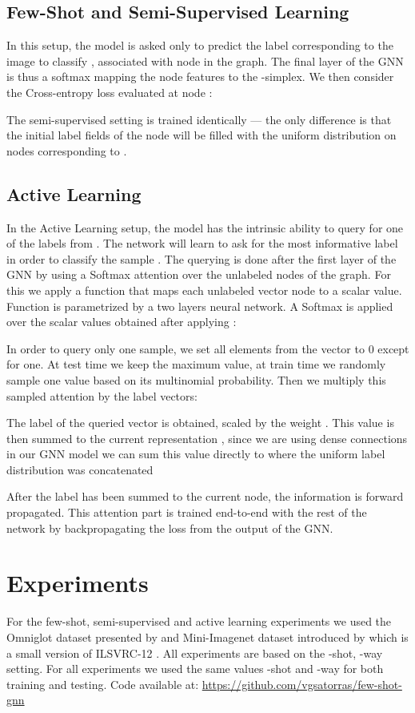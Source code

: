 \documentclass{article} \usepackage{iclr2018_conference,times}
\begin{document}
\subsection{Few-Shot and Semi-Supervised Learning}
\label{few_shot_semi_superv}


In this setup, the model is asked only to predict the label  corresponding to the 
image to classify , associated with node  in the graph. 
The final layer of the GNN is thus a softmax mapping
the node features to the -simplex. We then consider the Cross-entropy loss
evaluated at node :


The semi-supervised setting is trained identically --- the only difference is that 
the initial label fields of the node will be filled with the uniform distribution on nodes 
corresponding to . 

\subsection{Active Learning}
In the Active Learning setup, the model has the intrinsic ability to query for one of the labels from . The network will learn to ask for the most informative label in order to classify the sample . The querying is done after the first layer of the GNN by using a Softmax attention over the unlabeled nodes of the graph. For this we apply a function  that maps each unlabeled vector node to a scalar value. Function  is parametrized by a two layers neural network. A Softmax is applied over the  scalar values obtained after applying :

 
In order to query only one sample, we set all elements from the  vector to 0 except for one. At test time we keep the maximum value, at train time we randomly sample one value based on its multinomial probability. Then we multiply this sampled attention by the label vectors: 

The label of the queried vector  is obtained, scaled by the weight . This value is then summed to the current representation , since we are using dense connections in our GNN model we can sum this  value directly to where the uniform label distribution was concatenated 

After the label has been summed to the current node, the information is forward propagated. This attention part is trained end-to-end with the rest of the network by backpropagating the loss from the output of the GNN. 


 \section{Experiments}
\label{experimentssec}
For the few-shot, semi-supervised and active learning experiments we used the Omniglot dataset presented by \cite{lake2015human} and Mini-Imagenet dataset introduced by \cite{vinyals2016matching} which is a small version of ILSVRC-12 \cite{krizhevsky2012imagenet}. All experiments are based on the -shot, -way setting. For all experiments we used the same values -shot and -way for both training and testing.
\newline
{\scriptsize Code available at: \url{https://github.com/vgsatorras/few-shot-gnn}}
\end{document}

